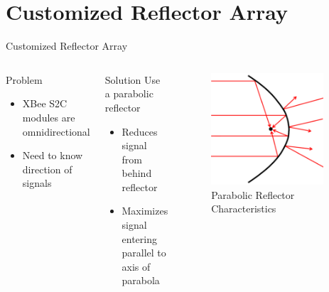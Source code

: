 \documentclass{beamer}
\begin{document}

\section{Customized Reflector Array}

\begin{frame}{Customized Reflector Array}
  \begin{columns}
      \begin{block}{Problem}
        \begin{itemize}
          \item XBee S2C modules are omnidirectional
          \item Need to know direction of signals
        \end{itemize}
      \end{block}
      \pause
      \begin{block}{Solution}
        Use a parabolic reflector
        \begin{itemize}
          \item Reduces signal from behind reflector
          \item Maximizes signal entering parallel to axis of parabola
        \end{itemize}
      \end{block}
      \begin{figure}
        \centering
        \includegraphics[width=0.9\textwidth]{figs/img/parabolicReflectorDiagram.png}
        \caption{Parabolic Reflector Characteristics}
        \label{fig:parabolicReflectorDiagram}
      \end{figure}
  \end{columns}
\end{frame}
\end{document}
